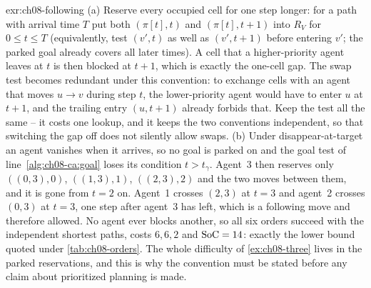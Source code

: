 \begin{solution}{exr:ch08-following}
(a) Reserve every occupied cell for one step longer: for a path with arrival time $T$ put both $(\pi[t], t)$ and $(\pi[t], t{+}1)$ into $R_V$ for $0 \le t \le T$ (equivalently, test $(v', t)$ as well as $(v', t{+}1)$ before entering $v'$; the parked goal already covers all later times). A cell that a higher-priority agent leaves at $t$ is then blocked at $t+1$, which is exactly the one-cell gap. The swap test becomes redundant under this convention: to exchange cells with an agent that moves $u \to v$ during step $t$, the lower-priority agent would have to enter $u$ at $t+1$, and the trailing entry $(u, t{+}1)$ already forbids that. Keep the test all the same -- it costs one lookup, and it keeps the two conventions independent, so that switching the gap off does not silently allow swaps. (b) Under disappear-at-target an agent vanishes when it arrives, so no goal is parked on and the goal test of line~\ref{alg:ch08-ca:goal} loses its condition $t > t_\gamma$. Agent~3 then reserves only $((0,3),0)$, $((1,3),1)$, $((2,3),2)$ and the two moves between them, and it is gone from $t = 2$ on. Agent~1 crosses $(2,3)$ at $t = 3$ and agent~2 crosses $(0,3)$ at $t = 3$, one step after agent~3 has left, which is a following move and therefore allowed. No agent ever blocks another, so all six orders succeed with the independent shortest paths, costs $6, 6, 2$ and $\mathrm{SoC} = 14$: exactly the lower bound quoted under \cref{tab:ch08-orders}. The whole difficulty of \cref{ex:ch08-three} lives in the parked reservations, and this is why the convention must be stated before any claim about prioritized planning is made.
\end{solution}


